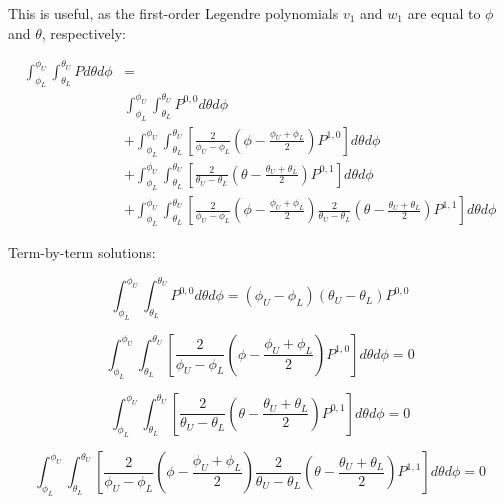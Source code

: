 \documentclass[12pt,a4paper,pagesize=pdftex]{scrartcl}
\begin{document}
This is useful, as the first-order Legendre polynomials \(v_1\) and \(w_1\) are equal to \(\phi\) and \(\theta\), respectively:

\begin{align*}
    \int_{\phi_L}^{\phi_U} \int_{\theta_L}^{\theta_U} P d\theta d\phi & = \\
    & \int_{\phi_L}^{\phi_U} \int_{\theta_L}^{\theta_U} P^{0,0} d\theta d\phi \\
    & + \int_{\phi_L}^{\phi_U} \int_{\theta_L}^{\theta_U} \left[\frac{2}{\phi_U - \phi_L} \left(\phi - \frac{\phi_U + \phi_L}{2}\right) P^{1,0}\right] d\theta d\phi \\
    & + \int_{\phi_L}^{\phi_U} \int_{\theta_L}^{\theta_U} \left[\frac{2}{\theta_U - \theta_L} \left(\theta - \frac{\theta_U + \theta_L}{2}\right) P^{0,1}\right] d\theta d\phi \\
    & + \int_{\phi_L}^{\phi_U} \int_{\theta_L}^{\theta_U} \left[\frac{2}{\phi_U - \phi_L} \left(\phi - \frac{\phi_U + \phi_L}{2}\right) \frac{2}{\theta_U - \theta_L} \left(\theta - \frac{\theta_U + \theta_L}{2}\right) P^{1,1}\right] d\theta d\phi
\end{align*}

Term-by-term solutions:

\begin{equation*}
    \int_{\phi_L}^{\phi_U} \int_{\theta_L}^{\theta_U} P^{0,0} d\theta d\phi = \left(\phi_U - \phi_L\right) \left(\theta_U - \theta_L\right) P^{0,0}
\end{equation*}

\begin{equation*}
    \int_{\phi_L}^{\phi_U} \int_{\theta_L}^{\theta_U} \left[\frac{2}{\phi_U - \phi_L} \left(\phi - \frac{\phi_U + \phi_L}{2}\right) P^{1,0} \right] d\theta d\phi = 0
\end{equation*}

\begin{equation*}
    \int_{\phi_L}^{\phi_U} \int_{\theta_L}^{\theta_U} \left[\frac{2}{\theta_U - \theta_L} \left(\theta - \frac{\theta_U + \theta_L}{2}\right) P^{0,1} \right] d\theta d\phi = 0
\end{equation*}

\begin{equation*}
    \int_{\phi_L}^{\phi_U} \int_{\theta_L}^{\theta_U}  \left[\frac{2}{\phi_U - \phi_L} \left(\phi - \frac{\phi_U + \phi_L}{2}\right) \frac{2}{\theta_U - \theta_L} \left(\theta - \frac{\theta_U + \theta_L}{2}\right) P^{1,1}\right] d\theta d\phi = 0
\end{equation*}
\end{document}
